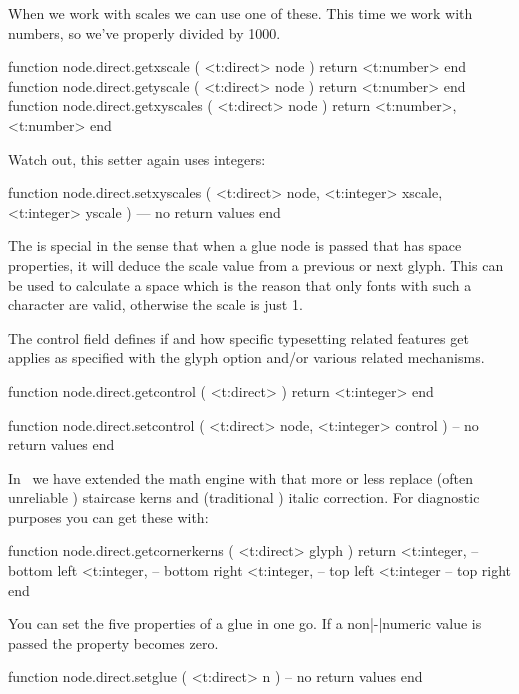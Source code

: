 When we work with scales we can use one of these. This time we work
with numbers, so we've properly divided by 1000.

\starttyping[option=LUA]
function node.direct.getxscale  ( <t:direct> node )
    return <t:number>
end
function node.direct.getyscale  ( <t:direct> node )
    return <t:number>
end
function node.direct.getxyscales ( <t:direct> node )
    return <t:number>,  <t:number>
end
\stoptyping

Watch out, this setter again uses integers:

\starttyping[option=LUA]
function node.direct.setxyscales (
    <t:direct>  node,
    <t:integer> xscale,
    <t:integer> yscale
)
    --- no return values
end
\stoptyping

The  is special in the sense that when a glue node is passed
that has space properties, it will deduce the scale value from a previous or next
glyph. This can be used to calculate a space which is the reason that only fonts
with such a character are valid, otherwise the scale is just 1.

The control field defines if and how specific typesetting related features get
applies as specified with the glyph option and/or various related mechanisms.

\starttyping[option=LUA]
function node.direct.getcontrol (
    <t:direct>
)
    return <t:integer>
end

function node.direct.setcontrol (
    <t:direct>  node,
    <t:integer> control
)
    -- no return values
end
\stoptyping

In \LUAMETATEX\ we have extended the math engine with  that
more or less replace (often unreliable \OPENTYPE) staircase kerns and
(traditional \TEX) italic correction. For diagnostic purposes you can get these
with:

\starttyping[option=LUA]
function node.direct.getcornerkerns (
    <t:direct> glyph
)
    return
        <t:integer, -- bottom left
        <t:integer, -- bottom right
        <t:integer, -- top left
        <t:integer  -- top right
end
\stoptyping

\stopsubsection

\startsubsection[title={Glue}]

You can set the five properties of a glue in one go. If a non|-|numeric value is
passed the property becomes zero.

\starttyping[option=LUA]
function node.direct.setglue ( <t:direct> n )
    -- no return values
end

